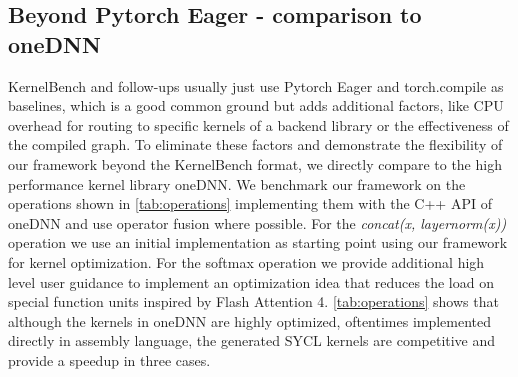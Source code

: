 \subsection{Beyond Pytorch Eager - comparison to oneDNN}
KernelBench and follow-ups usually just use Pytorch Eager and torch.compile as baselines, which is a good common ground but adds additional factors, like CPU overhead for routing to specific kernels of a backend library or the effectiveness of the compiled graph.
To eliminate these factors and demonstrate the flexibility of our framework beyond the KernelBench format, we directly compare to the high performance kernel library oneDNN.
We benchmark our framework on the operations shown in \autoref{tab:operations} implementing them with the C++ API of oneDNN and use operator fusion where possible.
For the \emph{concat(x, layernorm(x))} operation we use an initial implementation as starting point using our framework for kernel optimization. For the softmax operation we provide additional high level user guidance to implement an optimization idea that reduces the load on special function units inspired by Flash Attention 4. 
\autoref{tab:operations} shows that although the kernels in oneDNN are highly optimized, oftentimes implemented directly in assembly language, the generated SYCL kernels are competitive and provide a speedup in three cases. %
\begin{table}[h!]
    \centering
    \caption{Speedup compared to the oneDNN C++ implementation}
    \label{tab:operations}
\end{table}



